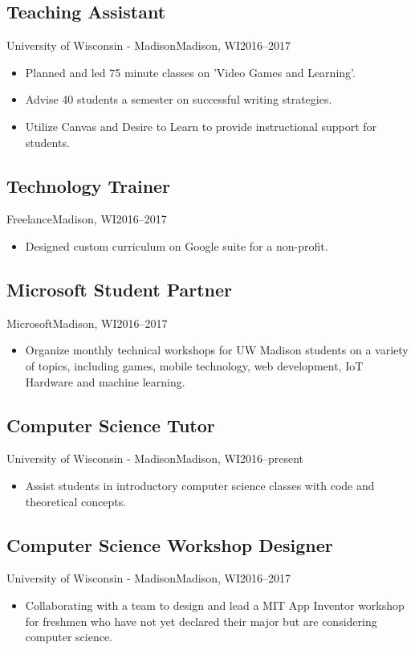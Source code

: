 \documentclass[../main.tex]{subfiles}
\begin{document}
	\subsection{Teaching Assistant}{University of Wisconsin - Madison}{Madison, WI}{2016--2017}
	\begin{itemize}
		\item{Planned and led 75 minute classes on 'Video Games and Learning'.}
		\item{Advise 40 students a semester on successful writing strategies.}
		\item{Utilize Canvas and Desire to Learn to provide instructional support for students.}
	\end{itemize}

	\subsection{Technology Trainer}{Freelance}{Madison, WI}{2016--2017}
	\begin{itemize}
		\item{Designed custom curriculum on Google suite for a non-profit.}
	\end{itemize}


	\subsection{Microsoft Student Partner}{Microsoft}{Madison, WI}{2016--2017}
	\begin{itemize}
		\item{Organize monthly technical workshops for UW Madison students on a variety of topics, including games, mobile technology, web development, IoT Hardware and machine learning.}
	\end{itemize}

	\subsection{Computer Science Tutor}{University of Wisconsin - Madison}{Madison, WI}{2016--present}
	\begin{itemize}
		\item{Assist students in introductory computer science classes with code and theoretical concepts.}
	\end{itemize}

	\subsection{Computer Science Workshop Designer}{University of Wisconsin - Madison}{Madison, WI}{2016--2017}
	\begin{itemize}
		\item{Collaborating with a team to design and lead a MIT App Inventor workshop for freshmen who have not yet declared their major but are considering computer science.}
	\end{itemize}
\end{document}
